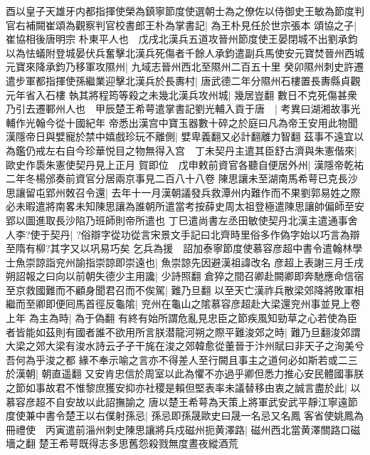 酉以皇子天雄牙内都指揮使榮為鎮寧節度使選朝士為之僚佐以侍御史王敏為節度判官右補闕崔頌為觀察判官校書郎王朴為掌書記|{
	為王朴見任於世宗張本}
頌協之子|{
	崔協相後唐明宗}
朴東平人也　戊戌北漢兵五道攻晉州節度使王晏閉城不出劉承鈞以為怯蟻附登城晏伏兵奮擊北漢兵死傷者千餘人承鈞遣副兵馬使安元寶焚晉州西城元寶來降承鈞乃移軍攻隰州|{
	九域志晉州西北至隰州二百五十里}
癸卯隰州刺史許遷遣步軍都指揮使孫繼業迎擊北漢兵於長夀村|{
	唐武德二年分隰州石樓置長夀縣貞觀元年省入石樓}
執其將程筠等殺之未幾北漢兵攻州城|{
	幾居豈翻}
數日不克死傷甚衆乃引去遷鄆州人也　甲辰楚王希萼遣掌書記劉光輔入貢于唐　|{
	考異曰湖湘故事光輔作光翰今從十國紀年}
帝悉出漢宫中寶玉器數十碎之於庭曰凡為帝王安用此物聞漢隱帝日與嬖寵於禁中嬉戲珍玩不離側|{
	嬖卑義翻又必計翻離力智翻}
茲事不遠宜以為鑑仍戒左右自今珍華悦目之物無得入宫　丁未契丹主遣其臣舒古濟與朱憲偕來|{
	歐史作䮍朱憲使契丹見上正月}
賀即位　戊申敕前資官各聽自便居外州|{
	漢隱帝乾祐二年冬楊邠奏前資官分居兩京事見二百八十八卷}
陳思讓未至湖南馬希萼已克長沙思讓留屯郢州敇召令還|{
	去年十一月漢朝議發兵救潭州内難作而不果劉郭易姓之際必未暇遣將南畧未知陳思讓為誰朝所遣當考按薛史周太祖登極遣陳思讓帥偏師至安郢以圖進取長沙陷乃班師則帝所遣也}
丁巳遣尚書左丞田敏使契丹北漢主遣通事舍人李?使于契丹|{
	?俗辯字從功從言宋景文手記曰北齊時里俗多作偽字始以巧言為辯至隋有柳?其字又以巩易巧矣}
乞兵為援　詔加泰寧節度使慕容彦超中書令遣翰林學士魚崇諒詣兖州諭指崇諒即崇遠也|{
	魚崇諒先因避漢祖諱改名}
彦超上表謝三月壬戌朔詔報之曰向以前朝失德少主用讒|{
	少詩照翻}
倉猝之間召卿赴闕卿即奔馳應命信宿至京救國難而不顧身聞君召而不俟駕|{
	難乃旦翻}
以至天亡漢祚兵散梁郊降將敗軍相繼而至卿即便囘馬首徑反龜隂|{
	兖州在龜山之隂慕容彦超赴大梁還兖州事並見上卷上年}
為主為時|{
	為于偽翻}
有終有始所謂危亂見忠臣之節疾風知勁草之心若使為臣者皆能如茲則有國者誰不欲用所言朕潜龍河朔之際平難浚郊之時|{
	難乃旦翻浚郊謂大梁之郊大梁有浚水詩云孑孑干旄在浚之郊韓愈從董晉于汴州賦曰非天子之洵美兮吾何為乎浚之都}
緣不奉示喻之言亦不得差人至行闕且事主之道何必如斯若或二三於漢朝|{
	朝直遥翻}
又安肯忠信於周室以此為懼不亦過乎卿但悉力推心安民體國事朕之節如事故君不惟黎庶獲安抑亦社稷是賴但堅表率未議替移由衷之誠言盡於此|{
	以慕容彦超不自安故以此詔撫諭之}
唐以楚王希萼為天策上將軍武安武平靜江寧遠節度使兼中書令楚王以右僕射孫忌|{
	孫忌即孫晟歐史曰晟一名忌又名鳳}
客省使姚鳳為冊禮使　丙寅遣前淄州刺史陳思讓將兵戍磁州扼黄澤路|{
	磁州西北當黄澤關路口磁墻之翻}
楚王希萼既得志多思舊怨殺戮無度晝夜縱酒荒

